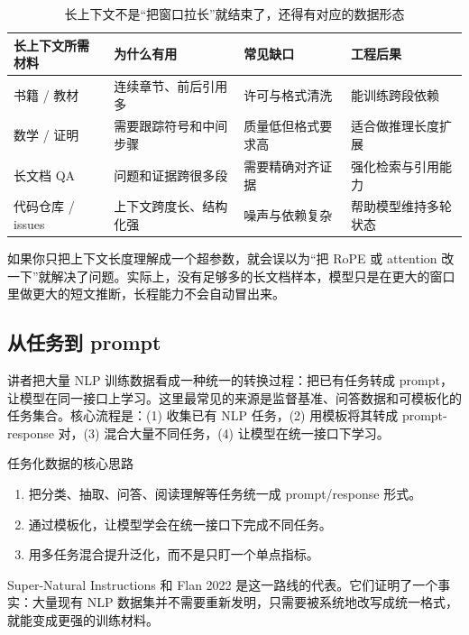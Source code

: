 \begin{table}[H]
\centering
\begin{tabular}{p{}p{}p{}p{}}
\toprule
\textbf{长上下文所需材料} & \textbf{为什么有用} & \textbf{常见缺口} & \textbf{工程后果} \\
\midrule
书籍 / 教材 & 连续章节、前后引用多 & 许可与格式清洗 & 能训练跨段依赖 \\
数学 / 证明 & 需要跟踪符号和中间步骤 & 质量低但格式要求高 & 适合做推理长度扩展 \\
长文档 QA & 问题和证据跨很多段 & 需要精确对齐证据 & 强化检索与引用能力 \\
代码仓库 / issues & 上下文跨度长、结构化强 & 噪声与依赖复杂 & 帮助模型维持多轮状态 \\
\bottomrule
\end{tabular}
\caption{长上下文不是“把窗口拉长”就结束了，还得有对应的数据形态}
\end{table}

如果你只把上下文长度理解成一个超参数，就会误以为“把 RoPE 或 attention 改一下”就解决了问题。实际上，没有足够多的长文档样本，模型只是在更大的窗口里做更大的短文推断，长程能力不会自动冒出来。

\subsection{从任务到 prompt}

讲者把大量 NLP 训练数据看成一种统一的转换过程：把已有任务转成 prompt，让模型在同一接口上学习。这里最常见的来源是监督基准、问答数据和可模板化的任务集合。核心流程是：(1) 收集已有 NLP 任务，(2) 用模板将其转成 prompt-response 对，(3) 混合大量不同任务，(4) 让模型在统一接口下学习。

\begin{importantbox}{任务化数据的核心思路}
\begin{enumerate}
    \item 把分类、抽取、问答、阅读理解等任务统一成 prompt/response 形式。
    \item 通过模板化，让模型学会在统一接口下完成不同任务。
    \item 用多任务混合提升泛化，而不是只盯一个单点指标。
\end{enumerate}
\end{importantbox}

Super-Natural Instructions 和 Flan 2022 是这一路线的代表。它们证明了一个事实：大量现有 NLP 数据集并不需要重新发明，只需要被系统地改写成统一格式，就能变成更强的训练材料。

